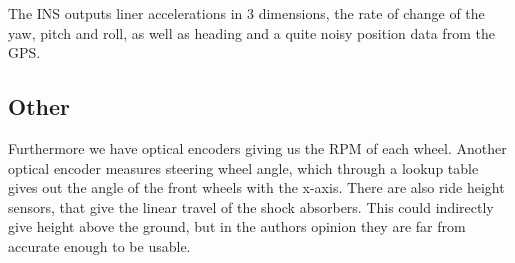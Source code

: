 The INS outputs liner accelerations in 3 dimensions, the rate of change of the yaw, pitch and roll, as well as heading and a quite noisy position data from the GPS. 

\subsection{Other}
Furthermore we have optical encoders giving us the RPM of each wheel. Another optical encoder measures steering wheel angle, which through a lookup table gives out the angle of the front wheels with the x-axis. There are also ride height sensors, that give the linear travel of the shock absorbers. This could indirectly give height above the ground, but in the authors opinion they are far from accurate enough to be usable.